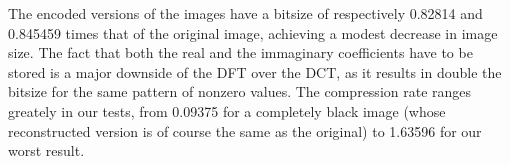 The encoded versions of the images have a bitsize of respectively 0.82814 and 0.845459 times that of the original image, achieving a modest decrease in image size. The fact that both the real and the immaginary coefficients have to be stored is a major downside of the DFT over the DCT, as it results in double the bitsize for the same pattern of nonzero values. The compression rate ranges greately in our tests, from 0.09375 for a completely black image (whose reconstructed version is of course the same as the original) to 1.63596 for our worst result.